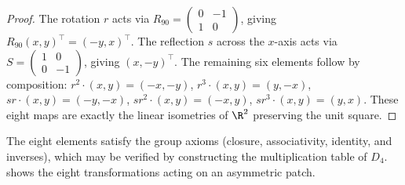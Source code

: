 \begin{proof}
The rotation $r$ acts via $R_{90} = \left(\begin{smallmatrix} 0 & -1 \\ 1 & 0
\end{smallmatrix}\right)$, giving $R_{90}(x,y)^\top = (-y,x)^\top$. The
reflection $s$ across the $x$-axis acts via $S = \left(\begin{smallmatrix} 1 & 0
\\ 0 & -1 \end{smallmatrix}\right)$, giving $(x,-y)^\top$. The remaining six
elements follow by composition: $r^2 \cdot (x,y) = (-x,-y)$, $r^3 \cdot (x,y) =
(y,-x)$, $sr \cdot (x,y) = (-y,-x)$, $sr^2 \cdot (x,y) = (-x,y)$, $sr^3 \cdot
(x,y) = (y,x)$. These eight maps are exactly the linear isometries of $\R^2$
preserving the unit square.
\end{proof}

The eight elements satisfy the group axioms (closure, associativity, identity,
and inverses), which may be verified by constructing the multiplication table
of $D_4$.  shows the eight transformations acting on
an asymmetric patch.


